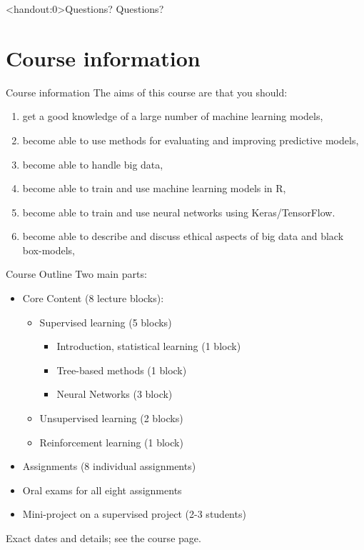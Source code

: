 \documentclass[10pt]{beamer}
\begin{document}
\begin{frame}<handout:0>{Questions?}
Questions?
\end{frame}


\section{Course information}
\frame{\sectionpage}

\begin{frame}{Course information}
The aims of this course are that you should:\\[3mm]\pause
\begin{enumerate}
\item get a good knowledge of a large number of machine learning models,
\item become able to use methods for evaluating and improving predictive models,
\item become able to handle big data,
\item become able to train and use machine learning models in R,
\item become able to train and use neural networks using Keras/TensorFlow.
\item become able to describe and discuss ethical aspects of big data and black box-models,
\end{enumerate}

\end{frame}


\begin{frame}{Course Outline}
Two main parts:
\begin{itemize}
\item Core Content (8 lecture blocks):
\begin{itemize}
\item Supervised learning (5 blocks)
\begin{itemize}
\item Introduction, statistical learning (1 block)
\item Tree-based methods (1 block)
\item Neural Networks (3 block)
\end{itemize}
\item Unsupervised learning (2 blocks)
\item Reinforcement learning (1 block)\pause
\end{itemize}
\item Assignments (8 individual assignments)\pause
\item Oral exams for all eight assignments \pause
\item Mini-project on a supervised project (2-3 students)\pause
\end{itemize}
Exact dates and details; see the course page.
\end{frame}
\end{document}
